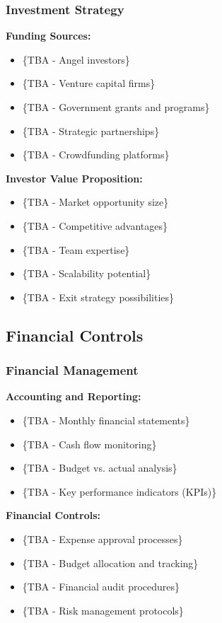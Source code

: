 \subsubsection{Investment Strategy}
\textbf{Funding Sources:}
\begin{itemize}
    \item \{TBA - Angel investors\}
    \item \{TBA - Venture capital firms\}
    \item \{TBA - Government grants and programs\}
    \item \{TBA - Strategic partnerships\}
    \item \{TBA - Crowdfunding platforms\}
\end{itemize}

\textbf{Investor Value Proposition:}
\begin{itemize}
    \item \{TBA - Market opportunity size\}
    \item \{TBA - Competitive advantages\}
    \item \{TBA - Team expertise\}
    \item \{TBA - Scalability potential\}
    \item \{TBA - Exit strategy possibilities\}
\end{itemize}

\subsection{Financial Controls}
\subsubsection{Financial Management}
\textbf{Accounting and Reporting:}
\begin{itemize}
    \item \{TBA - Monthly financial statements\}
    \item \{TBA - Cash flow monitoring\}
    \item \{TBA - Budget vs. actual analysis\}
    \item \{TBA - Key performance indicators (KPIs)\}
\end{itemize}

\textbf{Financial Controls:}
\begin{itemize}
    \item \{TBA - Expense approval processes\}
    \item \{TBA - Budget allocation and tracking\}
    \item \{TBA - Financial audit procedures\}
    \item \{TBA - Risk management protocols\}
\end{itemize}

